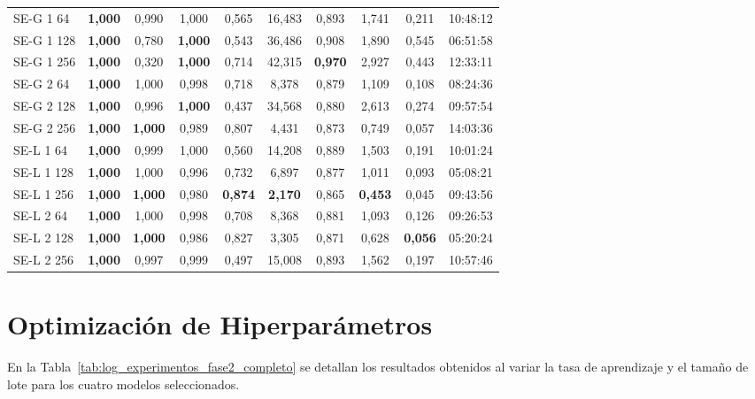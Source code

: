 \begin{longtable}{lccccccccc}
\midrule
SE-G 1 64 & \textbf{1,000} & 0,990 & 1,000 & 0,565 & 16,483 & 0,893 & 1,741 & 0,211 & 10:48:12\\
SE-G 1 128 & \textbf{1,000} & 0,780 & \textbf{1,000} & 0,543 & 36,486 & 0,908 & 1,890 & 0,545 & 06:51:58\\
SE-G 1 256 & \textbf{1,000} & 0,320 & \textbf{1,000} & 0,714 & 42,315 & \textbf{0,970} & 2,927 & 0,443 & 12:33:11\\
SE-G 2 64 & \textbf{1,000} & 1,000 & 0,998 & 0,718 & 8,378 & 0,879 & 1,109 & 0,108 & 08:24:36\\
SE-G 2 128 & \textbf{1,000} & 0,996 & \textbf{1,000} & 0,437 & 34,568 & 0,880 & 2,613 & 0,274 & 09:57:54\\
SE-G 2 256 & \textbf{1,000} & \textbf{1,000} & 0,989 & 0,807 & 4,431 & 0,873 & 0,749 & 0,057 & 14:03:36\\
SE-L 1 64 & \textbf{1,000} & 0,999 & 1,000 & 0,560 & 14,208 & 0,889 & 1,503 & 0,191 & 10:01:24\\
SE-L 1 128 & \textbf{1,000} & 1,000 & 0,996 & 0,732 & 6,897 & 0,877 & 1,011 & 0,093 & 05:08:21\\
SE-L 1 256 & \textbf{1,000} & \textbf{1,000} & 0,980 & \textbf{0,874} & \textbf{2,170} & 0,865 & \textbf{0,453} & 0,045 & 09:43:56\\
SE-L 2 64 & \textbf{1,000} & 1,000 & 0,998 & 0,708 & 8,368 & 0,881 & 1,093 & 0,126 & 09:26:53\\
SE-L 2 128 & \textbf{1,000} & \textbf{1,000} & 0,986 & 0,827 & 3,305 & 0,871 & 0,628 & \textbf{0,056} & 05:20:24\\
SE-L 2 256 & \textbf{1,000} & 0,997 & 0,999 & 0,497 & 15,008 & 0,893 & 1,562 & 0,197 & 10:57:46\\
\end{longtable}

\section{Optimización de Hiperparámetros}
\label{sec:apendice_vae_fase2}

En la Tabla~\ref{tab:log_experimentos_fase2_completo} se detallan los resultados obtenidos al variar la tasa de aprendizaje y el tamaño de lote para los cuatro modelos seleccionados.

